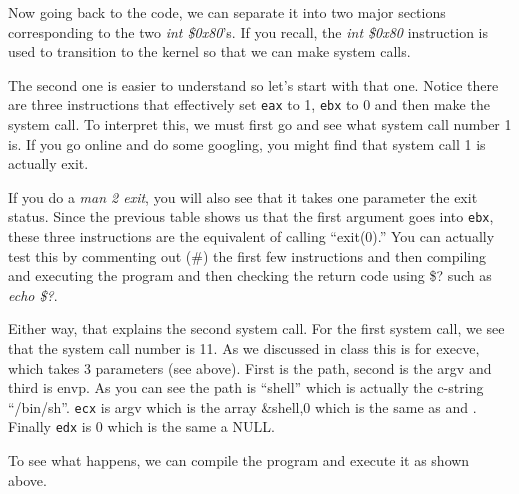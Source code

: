 Now going back to the code, we can separate it into two major sections corresponding to the two {\em int \$0x80}’s. If you recall, the {\em int \$0x80} instruction is used to transition to the kernel so that we can make system calls. 

The second one is easier to understand so let’s start with that one. Notice there are three instructions that effectively set {\tt eax} to 1, {\tt ebx} to 0 and then make the system call. To interpret this, we must first go and see what system call number 1 is. If you go online and do some googling, you might find that system call 1 is actually exit. 

If you do a {\em man 2 exit}, you will also see that it takes one parameter the exit status. Since the previous table shows us that the first argument goes into {\tt ebx}, these three instructions are the equivalent of calling ``exit(0).'' You can actually test this by commenting out (\#) the first few instructions and then compiling and executing the program and then checking the return code using \$? such as {\em echo \$?}. 

Either way, that explains the second system call. For the first system call, we see that the system call number is 11. As we discussed in class this is for execve, which takes 3 parameters (see above). First is the path, second is the argv and third is envp. As you can see the path is ``shell'' which is actually the c-string ``/bin/sh''. {\tt ecx} is argv which is the array \&shell,0 which is the same as  and . Finally {\tt edx} is 0 which is the same a NULL.

To see what happens, we can compile the program and execute it as shown above. 

